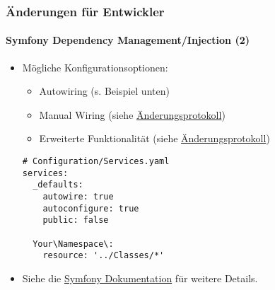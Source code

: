 \begin{frame}[fragile]
	\frametitle{Änderungen für Entwickler}
	\framesubtitle{Symfony Dependency Management/Injection (2)}

	\lstset{basicstyle=\tiny\ttfamily}

	\begin{itemize}
		\item Mögliche Konfigurationsoptionen:

			\begin{itemize}
				\item Autowiring (s. Beispiel unten)
				\item Manual Wiring 
					(siehe \href{https://docs.typo3.org/c/typo3/cms-core/master/en-us/Changelog/10.0/Feature-84112-SymfonyDependencyInjectionForCoreAndExtbase.html}{Änderungsprotokoll})
				\item Erweiterte Funktionalität
					(siehe \href{https://docs.typo3.org/c/typo3/cms-core/master/en-us/Changelog/10.0/Feature-84112-SymfonyDependencyInjectionForCoreAndExtbase.html}{Änderungsprotokoll})
			\end{itemize}


\begin{lstlisting}
# Configuration/Services.yaml
services:
  _defaults:
    autowire: true
    autoconfigure: true
    public: false

  Your\Namespace\:
    resource: '../Classes/*'
\end{lstlisting}

		\item Siehe die \href{https://symfony.com/doc/current/service_container.html}{Symfony Dokumentation} für weitere Details.

	\end{itemize}

\end{frame}


